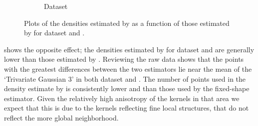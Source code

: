 \begin{figure}
\begin{subfigure}{0.23\textwidth}
				\caption{Dataset \baakmanTwo}
				\label{fig:discussion:performance:mbevssambe:baakman2}
			\end{subfigure}	
			\caption{Plots of the densities estimated by \sambe as a function of those estimated by \mbe for dataset %
				\ferdosiTwo and %
				\baakmanTwo.
			}
			\label{fig:discussion:performance:two:mbevssambe}
		\end{figure}
		
		 shows the opposite effect; the densities estimated by \sambe for dataset \ferdosiThree and \baakmanThree are generally lower than those estimated by \mbe. Reviewing the raw data shows that the points with the greatest differences between the two estimators lie near the mean of the `Trivariate Gaussian 3' in both dataset \ferdosiThree and \baakmanThree. The number of points used in the density estimate by \sambe is consistently lower and than those used by the fixed-shape estimator. Given the relatively high anisotropy of the kernels in that area we expect that this is due to the kernels reflecting fine local structures, that do not reflect the more global neighborhood. 
